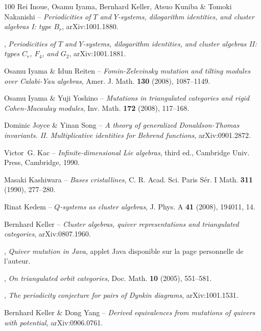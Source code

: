 \documentclass[brochure,12pt]{bourbaki}
\numberwithin{equation}{subsection}
\numberwithin{theorem}{section}
\begin{document}
\begin{thebibliography}{100}
{\sc Rei Inoue, Osamu Iyama, Bernhard Keller, Atsuo Kuniba \& Tomoki Nakanishi} --
  \emph{Periodicities of {$T$} and {$Y$}-systems, dilogarithm identities, and
  cluster algebras {I}: type {$B_r$}}, arXiv:1001.1880.

\bysame, \emph{Periodicities of {$T$} and {$Y$}-systems, dilogarithm
  identities, and cluster algebras {II}: types {$C_r$, $F_4$, and $G_2$}},
  arXiv:1001.1881.

{\sc Osamu Iyama \& Idun Reiten} -- \emph{Fomin-{Z}elevinsky mutation and tilting
  modules over {C}alabi-{Y}au algebras}, Amer. J. Math. \textbf{130} (2008),
1087--1149.

{\sc Osamu Iyama \& Yuji Yoshino} -- \emph{{Mutations in triangulated categories and
  rigid Cohen-Macaulay modules}}, Inv. Math. \textbf{172} (2008), 117--168.

{\sc Dominic Joyce \& Yinan Song} -- \emph{A theory of generalized {Donaldson-Thomas}
  invariants. {II}. {M}ultiplicative identities for {B}ehrend functions},
  arXiv:0901.2872.

{\sc Victor~G. Kac} -- \emph{Infinite-dimensional {L}ie algebras}, third ed., Cambridge
  Univ. Press, Cambridge, 1990.

{\sc Masaki Kashiwara} -- \emph{Bases cristallines}, C. R. Acad. Sci. Paris S\'er. I
  Math. \textbf{311} (1990), 277--280.


{\sc Rinat Kedem} -- \emph{{$Q$}-systems as cluster algebras}, J. Phys. A \textbf{41}
  (2008), 194011, 14.

{\sc Bernhard Keller} -- \emph{Cluster algebras, quiver representations and
  triangulated categories}, arXiv:0807.1960.

\bysame, \emph{Quiver mutation in {J}ava}, applet Java disponible sur la page
personnelle de l'auteur.

\bysame, \emph{{On triangulated orbit categories}}, Doc. Math. \textbf{10}
  (2005), 551--581.


\bysame, \emph{The periodicity conjecture for pairs of Dynkin
  diagrams}, arXiv:1001.1531.


{\sc Bernhard Keller \& Dong Yang} -- \emph{Derived equivalences from mutations of
  quivers with potential}, arXiv:0906.0761.


\end{thebibliography}
\end{document}
